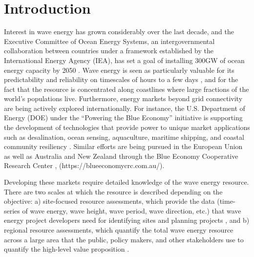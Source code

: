 \section{Introduction}

Interest in wave energy has grown considerably over the last decade, and the Executive Committee of Ocean Energy Systems, an intergovernmental collaboration between countries under a framework established by the International Energy Agency (IEA), has set a goal of installing 300GW of ocean energy capacity by 2050 \citep[]{babaritOceanWaveEnergy2017,huckerbyInternationalVisionOcean2017}. Wave energy is seen as particularly valuable for its predictability and reliability on timescales of hours to a few days \citep{parkinsonIntegratingOceanWave2015}, and for the fact that the resource is concentrated along coastlines where large fractions of the world's populations live. \DIFdelbegin {}\DIFdelend Furthermore, energy markets beyond grid connectivity are being actively explored internationally. For instance, the U.S. Department of Energy (DOE) under the ``Powering the Blue Economy'' initiative  is supporting the development of technologies that provide power to unique market applications such as desalination, ocean sensing, aquaculture, maritime shipping, and coastal community resiliency \citep{livecchiPoweringBlueEconomy2019}. Similar efforts are being pursued in the European Union as well as Australia and New Zealand through the Blue Economy Cooperative Research Center \citep{europeancommission2021EUBlueEconomy2021}, (https://blueeconomycrc.com.au/).

Developing these markets require detailed knowledge of the wave energy resource. There are two scales at which the resource is described depending on the objective: a) site-focused resource assessments, which provide the data (time-series of wave energy, wave height, wave period, wave direction, etc.) that wave energy project developers need for identifying sites and planning projects \citep[e.g., ][]{internationalelectrotechnicalcommissionPart101Wave2015, robertsonCharacterizingShoreWave2014, kumarWaveEnergyResource2015}, and b) regional resource assessments, which quantify the total wave energy resource across a large area that the public, policy makers, and other stakeholders use to quantify the high-level value proposition \citep[e.g., ][]{EPRIwaveresource2011, gunnQuantifyingGlobalWave2012, hemerRevisedAssessmentAustralia2017}.
\DIFdelbegin {}\DIFdelend 

